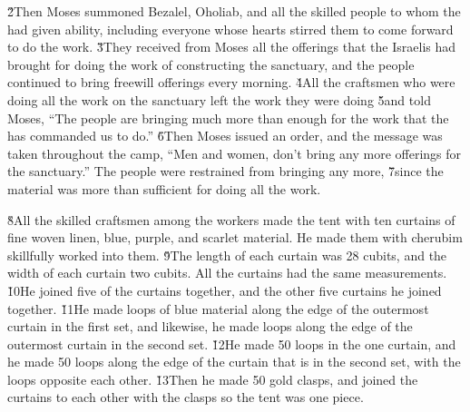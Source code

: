 \v{2}Then Moses summoned Bezalel, Oholiab, and all the skilled people to whom the  had given ability, including everyone whose hearts stirred them to come forward to do the work. \v{3}They received from Moses all the offerings that the Israelis had brought for doing the work of constructing the sanctuary, and the people continued to bring freewill offerings every morning. \v{4}All the craftsmen who were doing all the work on the sanctuary left the work they were doing \v{5}and told Moses, ``The people are bringing much more than enough for the work that the  has commanded us to do.'' \v{6}Then Moses issued an order, and the message was taken throughout the camp, ``Men and women, don't bring any more offerings for the sanctuary.'' The people were restrained from bringing any more, \v{7}since the material was more than sufficient for doing all the work.

\v{8}All the skilled craftsmen among the workers made the tent with ten curtains of fine woven linen, blue, purple, and scarlet material. He made them with cherubim skillfully worked into them. \v{9}The length of each curtain was 28 cubits, and the width of each curtain two cubits. All the curtains had the same measurements. \v{10}He joined five of the curtains together, and the other five curtains he joined together. \v{11}He made loops of blue material along the edge of the outermost curtain in the first set, and likewise, he made loops along the edge of the outermost curtain in the second set. \v{12}He made 50 loops in the one curtain, and he made 50 loops along the edge of the curtain that is in the second set, with the loops opposite each other. \v{13}Then he made 50 gold clasps, and joined the curtains to each other with the clasps so the tent was one piece.

